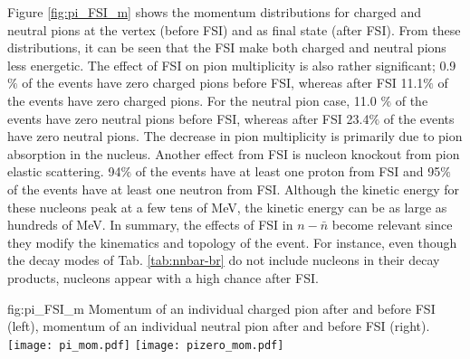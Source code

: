 Figure \ref{fig:pi_FSI_m} shows the momentum distributions for charged and neutral pions at the vertex (before FSI) and as final state (after FSI). From these distributions, it can be seen that the FSI make both charged and neutral pions less energetic.  The effect of FSI on pion multiplicity is also rather significant; 0.9$\%$ of the events have zero charged pions before FSI, whereas after FSI 11.1$\%$ of the events have zero charged pions. For the neutral pion case, 11.0 $\%$ of the events have zero neutral pions before FSI, whereas after FSI 23.4$\%$ of the events have zero neutral pions. The decrease in pion multiplicity is primarily due to pion absorption in the nucleus. Another effect from FSI is nucleon knockout from pion elastic scattering. 94$\%$ of the events have at least one proton from FSI and 95$\%$ of the events have at least one neutron from FSI. Although the kinetic energy for these nucleons peak at a few tens of MeV, the kinetic energy can be as large as hundreds of MeV.  In summary, the effects of FSI in $n-\bar{n}$ become relevant since they modify the kinematics and topology of the event. For instance, even though the decay modes of Tab. \ref{tab:nnbar-br} do not include nucleons in their decay products, nucleons appear with a high chance after FSI.

\begin{dunefigure}
{fig:pi_FSI_m}
{Momentum of an individual charged pion after and before FSI (left), momentum of an individual neutral pion after and before FSI (right).}
\texttt{[image: pi\_mom.pdf]}
\texttt{[image: pizero\_mom.pdf]}
\end{dunefigure} 

